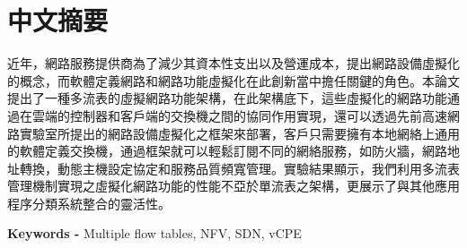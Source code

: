 \chapter*{中文摘要}
近年，網路服務提供商為了減少其資本性支出以及營運成本，提出網路設備虛擬化的概念，而軟體定義網路和網路功能虛擬化在此創新當中擔任關鍵的角色。本論文提出了一種多流表的虛擬網路功能架構，在此架構底下，這些虛擬化的網路功能通過在雲端的控制器和客戶端的交換機之間的協同作用實現，還可以透過先前高速網路實驗室所提出的網路設備虛擬化之框架來部署，客戶只需要擁有本地網絡上通用的軟體定義交換機，通過框架就可以輕鬆訂閱不同的網絡服務，如防火牆，網路地址轉換，動態主機設定協定和服務品質頻寬管理。實驗結果顯示，我們利用多流表管理機制實現之虛擬化網路功能的性能不亞於單流表之架構，更展示了與其他應用程序分類系統整合的靈活性。


\noindent \textbf{Keywords - }{Multiple flow tables, NFV, SDN, vCPE }
